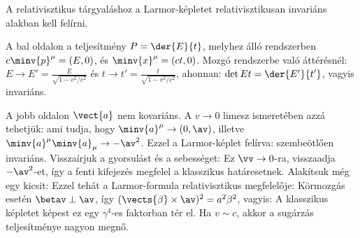     A relativisztikus tárgyaláshoz a Larmor-képletet relativisztikusan invariáns alakban kell felírni.
     
    A bal oldalon a teljesítmény $P=\der{E}{t}$, melyhez álló rendszerben $c\minv{p}^\mu=(E,0)$, és $\minv{x}^\mu=(ct,0)$.
   Mozgó rendszerbe való áttérésnél: $E\to E'=\frac{E}{\sqrt{1-v^2/c^2}}$ és $t\to t'=\frac{t}{\sqrt{1-v^2/c^2}}$, ahonnan: $\det{E}{t}=\der{E'}{t'}$, vagyis invariáns. 
    
    A jobb oldalon $\vect{a}$ nem kovariáns.
   A $v\to 0$ limesz ismeretében azzá tehetjük:
    ami tudja, hogy $\minv{a}^\mu\to (0,\av)$, illetve $\minv{a}^\mu \minv{a}_\mu\to -\av^2$.
   Ezzel a Larmor-képlet felírva:
    szembeötlően invariáns.
   Visszaírjuk a gyorsulást és a sebességet:
    Ez $\vv\to 0$-ra, visszaadja $-\av^2$-et, így a fenti kifejezés megfelel a klasszikus határesetnek.
   Alakítsuk még egy kicsit:
    Ezzel tehát a Larmor-formula relativisztikus megfelelője:
    Körmozgás esetén $\betav\perp\av$, így $(\vects{\beta}\times\av)^2=a^2\beta^2$, vagyis:
    A klasszikus képletet képest ez egy $\gamma^4$-es faktorban tér el.
   Ha $v\sim c$, akkor a sugárzás teljesítménye nagyon megnő.

